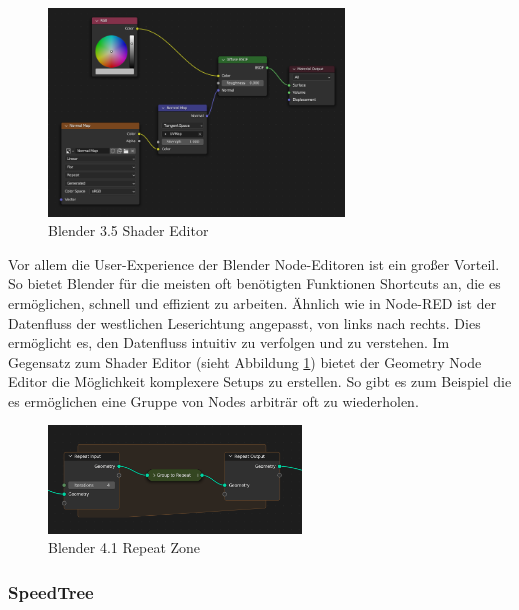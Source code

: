 \documentclass[ngerman]{article}
\begin{document}
\begin{figure}[htbp]
  \centering
  \includegraphics[width=0.7\textwidth]{./graphics/blender-shader.png}
  \caption{Blender 3.5 Shader Editor}
  \label{fig:blender-shader}
\end{figure}

Vor allem die User-Experience der Blender Node-Editoren ist ein großer Vorteil. So bietet Blender für die meisten oft benötigten Funktionen Shortcuts an, die es ermöglichen, schnell und effizient zu arbeiten.
Ähnlich wie in Node-RED ist der Datenfluss der westlichen Leserichtung angepasst, von links nach rechts. Dies ermöglicht es, den Datenfluss intuitiv zu verfolgen und zu verstehen.
\linebreak
\linebreak
Im Gegensatz zum Shader Editor (sieht Abbildung \ref{fig:blender-shader}) bietet der Geometry Node Editor die Möglichkeit komplexere Setups zu erstellen. So gibt es zum Beispiel   die es ermöglichen eine Gruppe von Nodes arbiträr oft zu wiederholen.

\begin{figure}[htbp]
  \centering
  \includegraphics[width=0.6\textwidth]{./graphics/modeling_geometry-nodes_repeat_zone.png}
  \caption{Blender 4.1 Repeat Zone}
  \label{fig:blender-repeat}
\end{figure}

\subsubsection{SpeedTree}
\end{document}
